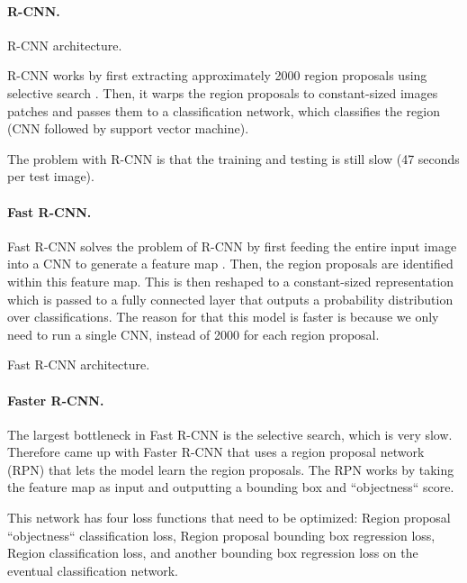 \paragraph{R-CNN.}

\begin{marginfigure}[6cm]
    \centering
    \caption{R-CNN architecture.}
    \label{fig:r-cnn}
\end{marginfigure}

R-CNN works by first extracting approximately 2000 region proposals using
selective search \citep{girshick2014rich}. Then, it warps the region proposals
to constant-sized images patches and passes them to a classification network,
which classifies the region (CNN followed by support vector machine).

The problem with R-CNN is that the training and testing is still slow (47
seconds per test image).

\paragraph{Fast R-CNN.}

Fast R-CNN solves the problem of R-CNN by first feeding the entire input image
into a CNN to generate a feature map \citep{girshick2015fast}. Then, the region
proposals are identified within this feature map. This is then reshaped to a
constant-sized representation which is passed to a fully connected layer that
outputs a probability distribution over classifications. The reason for that
this model is faster is because we only need to run a single CNN, instead of
2000 for each region proposal.

\begin{marginfigure}[3cm]
    \centering
    \caption{Fast R-CNN architecture.}
    \label{fig:fast-r-cnn}
\end{marginfigure}

\paragraph{Faster R-CNN.} 

The largest bottleneck in Fast R-CNN is the selective search, which is very
slow. Therefore \citet{ren2015faster} came up with Faster R-CNN that uses a
region proposal network (RPN) that lets the model learn the region proposals.
The RPN works by taking the feature map as input and outputting a bounding box
and ``objectness`` score.

This network has four loss functions that need to be optimized: Region proposal
``objectness`` classification loss, Region proposal bounding box regression
loss, Region classification loss, and another bounding box regression loss on
the eventual classification network.

